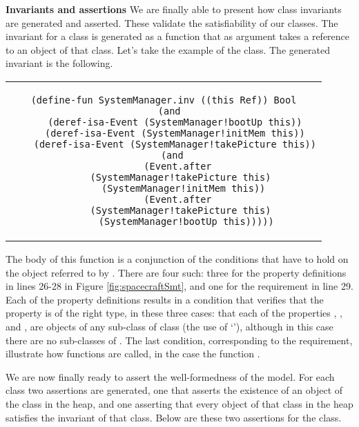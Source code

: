 
\textbf{Invariants and assertions} We are finally able to present how
class invariants are generated and asserted. These validate the
satisfiability of our classes.  The invariant for a class is generated
as a function that as argument takes a  reference to an
object of that class. Let's take the example of the
 class. The generated invariant is the following.

\begin{center}
\begin{tabular}{c}
\begin{lstlisting}
(define-fun SystemManager.inv ((this Ref)) Bool
  (and
    (deref-isa-Event (SystemManager!bootUp this))
    (deref-isa-Event (SystemManager!initMem this))
    (deref-isa-Event (SystemManager!takePicture this))
    (and 
      (Event.after 
        (SystemManager!takePicture this)  
        (SystemManager!initMem this)) 
      (Event.after 
        (SystemManager!takePicture this)  
        (SystemManager!bootUp this)))))
\end{lstlisting}
\end{tabular}
\end{center}

\noindent The body of this function is a conjunction of the conditions
that have to hold on the  object referred to by
. There are four such: three for the property definitions
in lines 26-28 in Figure \ref{fig:spacecraftSmt}, and one for the
requirement in line 29. Each of the property definitions results in a
condition that verifies that the property is of the right type, in
these three cases: that each of the properties ,
, and , are objects of any sub-class
of class  (the use of `'), although in this case
there are no sub-classes of . The last condition,
corresponding to the requirement, illustrate how functions are called,
in the case the function .

We are now finally ready to assert the well-formedness of the
model. For each class two assertions are generated, one that asserts
the existence of an object of the class in the heap, and one asserting
that every object of that class in the heap satisfies the invariant of
that class. Below are these two assertions for the 
class.

